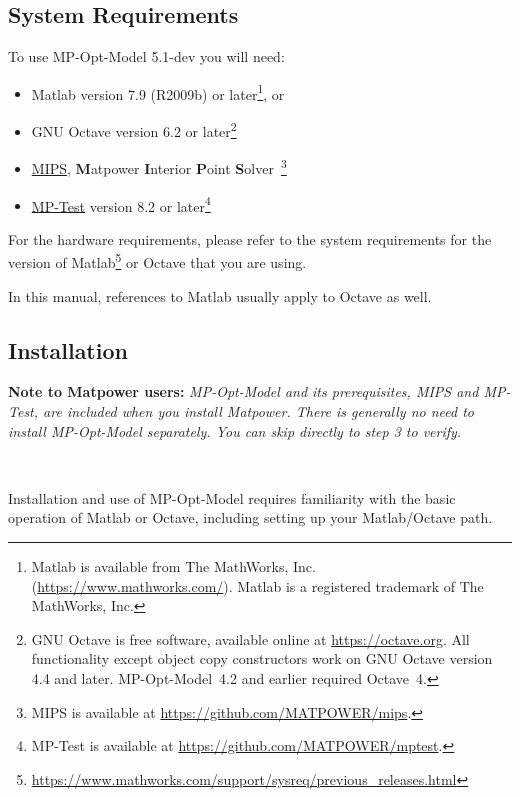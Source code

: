 \documentclass[12pt]{article}
\newcommand{\matlab}[0]{{\sc Matlab}}
\newcommand{\matpower}[0]{{\sc Matpower}}
\newcommand{\mptest}[0]{{MP-Test}}
\newcommand{\mptesturl}[0]{https://github.com/MATPOWER/mptest}
\newcommand{\mptestlink}[0]{\href{\mptesturl}{\mptest{}}}
\newcommand{\mips}[0]{{MIPS}}
\newcommand{\mipsurl}[0]{https://github.com/MATPOWER/mips}
\newcommand{\mipslink}[0]{\href{\mipsurl}{\mips{}}}
\newcommand{\mipsname}[0]{{{\bf M}{\sc atpower} \textbf{I}nterior \textbf{P}oint \textbf{S}olver}}
\newcommand{\mpom}[0]{\mbox{MP-Opt-Model}}
\newcommand{\mpomver}[0]{5.1-dev}
\numberwithin{equation}{section}
\numberwithin{table}{section}
\numberwithin{figure}{section}
\begin{document}
\subsection{System Requirements}
\label{sec:sysreq}
To use \mpom{} \mpomver{} you will need:
\begin{itemize}
\item \matlab{}\textsuperscript{\tiny \textregistered} version 7.9 (R2009b) or later\footnote{\matlab{} is available from The MathWorks, Inc. (\url{https://www.mathworks.com/}). \matlab{} is a registered trademark of The MathWorks, Inc.}, or
\item GNU Octave version 6.2 or later\footnote{GNU Octave \cite{octave} is free software, available online at \url{https://octave.org}. All functionality except object copy constructors work on GNU Octave version
4.4 and later. \mpom{}~4.2 and earlier required Octave~4.}
\item \mipslink{}, \mipsname{}~\cite{wang2007a, mips_manual}\footnote{\mips{} is available at \url{\mipsurl}.}
\item \mptestlink{} version 8.2 or later\footnote{\mptest{} is available at \url{\mptesturl}.}
\end{itemize}

For the hardware requirements, please refer to the system requirements for the version of \matlab{}\footnote{\url{https://www.mathworks.com/support/sysreq/previous_releases.html}} or Octave that you are using.

In this manual, references to \matlab{} usually apply to Octave as well.

\subsection{Installation}
\label{sec:installation}

{\bf Note to \matpower{} users:} \emph{\mpom{} and its prerequisites, \mips{} and \mptest{}, are included when you install \matpower{}. There is generally no need to install \mpom{} separately. You can skip directly to step 3 to verify.}

~

Installation and use of \mpom{} requires familiarity with the basic operation of \matlab{} or Octave, including setting up your \matlab{}/Octave path.
\end{document}
